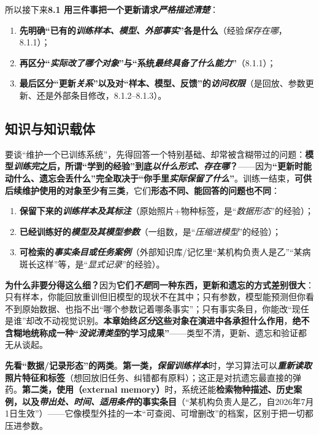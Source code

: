 所以接下来\textbf{8.1 用三件事把一个更新请求\emph{严格描述清楚}}：
\begin{enumerate}\item \textbf{先明确“已有的\emph{训练样本、模型、外部事实}”各是什么}（经验\emph{保存在哪}，8.1.1）；\item \textbf{再区分“\emph{实际改了哪个对象}”与“系统\emph{最终具备了什么能力}”}（8.1.1）；\item \textbf{最后区分“更新\emph{关系}”以及对“样本、模型、反馈”的\emph{访问权限}}（是回放、参数更新、还是外部条目修改，8.1.2–8.1.3）。\end{enumerate}

\subsection{知识与知识载体}
\label{sec:ket-overview-carriers}

要谈“维护一个已训练系统”，先得回答一个特别基础、却常被含糊带过的问题：\textbf{模型\emph{训练完}之后，所谓“学到的经验”到底\emph{以什么形式、存在哪}？}——因为\textbf{“更新时能动什么、遗忘会丢什么”完全取决于“你手里\emph{实际保留了什么}”}。训练一结束，\textbf{可供后续维护使用的对象至少有三类}，它们\textbf{形态不同、能回答的问题也不同}：
\begin{enumerate}\item \textbf{保留下来的\emph{训练样本及其标注}}（原始照片+物种标签，是“\emph{数据形态}”的经验）；\item \textbf{已经训练好的\emph{模型及其模型参数}}（一组数，是“\emph{压缩进模型}”的经验）；\item \textbf{可检索的\emph{事实条目或任务案例}}（外部知识库/记忆里“某机构负责人是乙”“某病斑长这样”等，是“\emph{显式记录}”的经验）。\end{enumerate}
\textbf{为什么非要分得这么细？}因为\textbf{它们\emph{不是}同一种东西，更新和遗忘的方式差别很大}：只有样本，你能回放重训但旧模型的现状不在其中；只有参数，模型能预测但你看不到原始数据、也指不出“哪个参数记着哪条事实”；只有事实条目，你能改“现任是谁”却改不动视觉识别。\textbf{本章始终\emph{区分}这些对象在演进中各承担什么作用}，\textbf{绝不含糊地统称成一种“\emph{没说清类型}的学习成果”}——类型不清，更新、遗忘和验证都无从谈起。

\textbf{先看“数据/记录形态”的两类}。\textbf{第一类，\emph{保留训练样本}}时，学习算法可以\textbf{\emph{重新读取}照片特征和标签}（想回放旧任务、纠错都有原料）；这正是对抗遗忘最直接的弹药。\textbf{第二类，使用（external memory）}时，系统还能\textbf{检索物种描述、历史案例，以及\emph{带出处、时间、适用条件}的事实条目}（“某机构负责人是乙，自2026年7月1日生效”）——它像模型外挂的一本“可查阅、可增删改”的档案，区别于把一切都压进参数。

